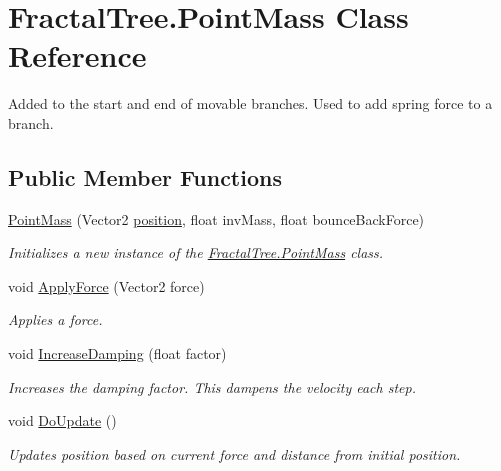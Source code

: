\hypertarget{class_fractal_tree_1_1_point_mass}{}\section{Fractal\+Tree.\+Point\+Mass Class Reference}
\label{class_fractal_tree_1_1_point_mass}


Added to the start and end of movable branches. Used to add spring force to a branch.  


\subsection*{Public Member Functions}
\begin{DoxyCompactItemize}
\item 
\hyperlink{class_fractal_tree_1_1_point_mass_aeae7254d48ee357290cc926783f76232}{Point\+Mass} (Vector2 \hyperlink{class_fractal_tree_1_1_point_mass_a388c55b55d073a8962d8c4e61ce4fd94}{position}, float inv\+Mass, float bounce\+Back\+Force)
\begin{DoxyCompactList}\small\item\em Initializes a new instance of the \hyperlink{class_fractal_tree_1_1_point_mass}{Fractal\+Tree.\+Point\+Mass} class. \end{DoxyCompactList}\item 
void \hyperlink{class_fractal_tree_1_1_point_mass_a6f5491d604a47a8dd4c2c26d349e618f}{Apply\+Force} (Vector2 force)
\begin{DoxyCompactList}\small\item\em Applies a force. \end{DoxyCompactList}\item 
void \hyperlink{class_fractal_tree_1_1_point_mass_aaade3e27a4d89806c8c1357b3c498898}{Increase\+Damping} (float factor)
\begin{DoxyCompactList}\small\item\em Increases the damping factor. This dampens the velocity each step. \end{DoxyCompactList}\item 
void \hyperlink{class_fractal_tree_1_1_point_mass_a376cf6a1c55c15a5ff8c504af6cd1ed7}{Do\+Update} ()
\begin{DoxyCompactList}\small\item\em Updates position based on current force and distance from initial position. \end{DoxyCompactList}\end{DoxyCompactItemize}
